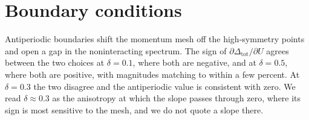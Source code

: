 \documentclass[aps,prb,reprint,superscriptaddress,amsmath,amssymb,floatfix]{revtex4-2}
\begin{document}
\section{Boundary conditions}
\label{app:bc}

Antiperiodic boundaries shift the momentum mesh off the high-symmetry points and
open a gap in the noninteracting spectrum. The sign of
$\partial \Delta_{\mathrm{tot}} / \partial U$ agrees between the two choices at
$\delta = 0.1$, where both are negative, and at $\delta = 0.5$, where both are
positive, with magnitudes matching to within a few percent. At $\delta = 0.3$ the
two disagree and the antiperiodic value is consistent with zero. We read
$\delta \approx 0.3$ as the anisotropy at which the slope passes through zero,
where its sign is most sensitive to the mesh, and we do not quote a slope there.

\begin{acknowledgments}
\end{acknowledgments}
\end{document}
